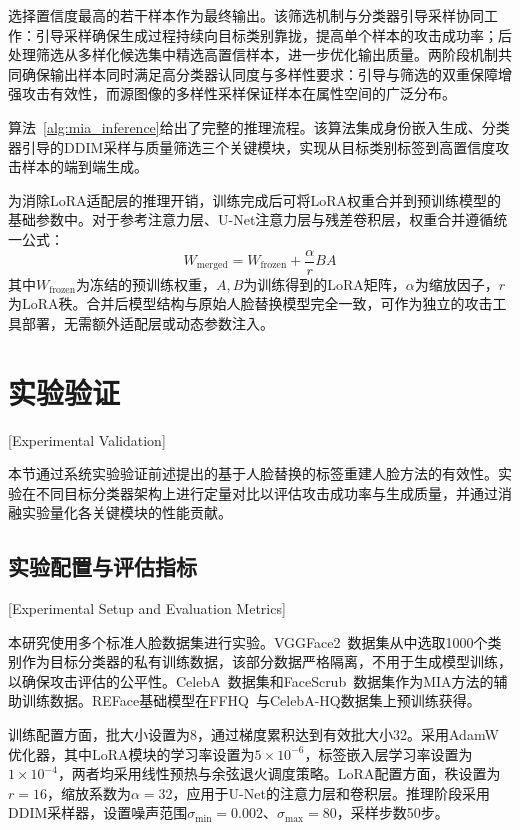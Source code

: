 选择置信度最高的若干样本作为最终输出。该筛选机制与分类器引导采样协同工作：引导采样确保生成过程持续向目标类别靠拢，提高单个样本的攻击成功率；后处理筛选从多样化候选集中精选高置信样本，进一步优化输出质量。两阶段机制共同确保输出样本同时满足高分类器认同度与多样性要求：引导与筛选的双重保障增强攻击有效性，而源图像的多样性采样保证样本在属性空间的广泛分布。

算法~\ref{alg:mia_inference}给出了完整的推理流程。该算法集成身份嵌入生成、分类器引导的DDIM采样与质量筛选三个关键模块，实现从目标类别标签到高置信度攻击样本的端到端生成。

为消除LoRA适配层的推理开销，训练完成后可将LoRA权重合并到预训练模型的基础参数中。对于参考注意力层、U-Net注意力层与残差卷积层，权重合并遵循统一公式：
\begin{equation}\label{eq:mia_inference_merge}
    W_{\text{merged}} = W_{\text{frozen}} + \frac{\alpha}{r} B A
\end{equation}
其中$W_{\text{frozen}}$为冻结的预训练权重，$A, B$为训练得到的LoRA矩阵，$\alpha$为缩放因子，$r$为LoRA秩。合并后模型结构与原始人脸替换模型完全一致，可作为独立的攻击工具部署，无需额外适配层或动态参数注入。


\section{实验验证}[Experimental Validation]
\label{sec:mia_experiments}

本节通过系统实验验证前述提出的基于人脸替换的标签重建人脸方法的有效性。实验在不同目标分类器架构上进行定量对比以评估攻击成功率与生成质量，并通过消融实验量化各关键模块的性能贡献。

\subsection{实验配置与评估指标}[Experimental Setup and Evaluation Metrics]
\label{sec:mia_setup}

本研究使用多个标准人脸数据集进行实验。VGGFace2~\cite{cao2018vggface2}数据集从中选取1000个类别作为目标分类器的私有训练数据，该部分数据严格隔离，不用于生成模型训练，以确保攻击评估的公平性。CelebA~\cite{liu2015deep}数据集和FaceScrub~\cite{ng2014data}数据集作为MIA方法的辅助训练数据。REFace基础模型在FFHQ~\cite{karras2019style}与CelebA-HQ数据集上预训练获得。

训练配置方面，批大小设置为8，通过梯度累积达到有效批大小32。采用AdamW优化器，其中LoRA模块的学习率设置为$5\times10^{-6}$，标签嵌入层学习率设置为$1\times10^{-4}$，两者均采用线性预热与余弦退火调度策略。LoRA配置方面，秩设置为$r=16$，缩放系数为$\alpha=32$，应用于U-Net的注意力层和卷积层。推理阶段采用DDIM采样器，设置噪声范围$\sigma_{\text{min}}=0.002$、$\sigma_{\text{max}}=80$，采样步数50步。

